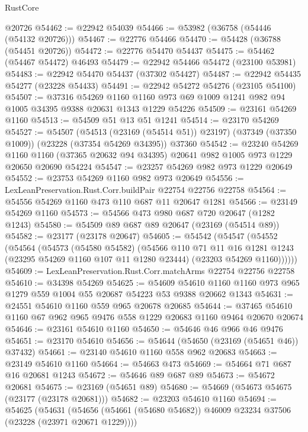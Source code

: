 \begin{lexlean}{RustCore}
\begin{coremodule}
    @20726
@54462 := @22942 @54039
@54466 := @53982 (@36758 (@54446 (@54132 @20726)))
@54467 := @22776 @54466
@54470 := @54428 (@36788 (@54451 @20726))
@54472 := @22776 @54470 @54437
@54475 := @54462 (@54467 @54472) @46493
@54479 := @22942 @54466 @54472 (@23100 @53981)
@54483 := @22942 @54470 @54437 (@37302 @54427)
@54487 := @22942 @54435 @54277 (@23228 @54433)
@54491 := @22942 @54272 @54276 (@23105 @54100)
@54507 := @37316
    @54269
    @1160
    @1160
    @973
    @69
    @1009
    @1241
    @982
    @94
    @1005
    @34395
    @9388
    @20631
    @1343
    @1229
    @54226
@54509 := @23161 @54269 @1160
@54513 := @54509 @51 @13 @51 @1241
@54514 := @23170 @54269
@54527 := @54507
    (@54513 (@23169 (@54514 @51)) @23197)
    (@37349 (@37350 @1009))
    (@23228 (@37354 @54269 @34395))
    @37360
@54542 := @23240
    @54269
    @1160
    @1160
    (@37365 @20632 @94 @34395)
    @20641
    @982
    @1005
    @973
    @1229
    @20650
    @20690
    @54224
@54547 := @23257 @54269 @982 @973 @1229 @20649
@54552 := @23753 @54269 @1160 @982 @973 @20649
@54556 := LexLeanPreservation.Rust.Corr.buildPair @22754 @22756 @22758
@54564 := @54556 @54269 @1160 @473 @110 @687 @11 @20647 @1281
@54566 := @23149 @54269 @1160
@54573 := @54566 @473 @980 @687 @720 @20647 (@1282 @1243)
@54580 := @54509 @89 @687 @89 @20647 (@23169 (@54514 @89))
@54582 := @23177 (@23178 @20647)
@54605 := @54542
    (@54547
      (@54552
        (@54564
          (@54573
            (@54580 @54582)
            (@54566
              @110
              @71
              @11
              @16
              @1281
              @1243
              (@23295 @54269 @1160 @107 @11 @1280 @23444)
              (@23203 @54269 @1160))))))
@54609 := LexLeanPreservation.Rust.Corr.matchArms @22754 @22756 @22758
@54610 := @34398 @54269
@54625 := @54609
    @54610
    @1160
    @1160
    @973
    @965
    @1279
    @559
    @1004
    @55
    @20687
    @54223
    @53
    @9388
    @20662
    @1343
@54631 := @24551 @54610 @1160 @559 @965 @20678 @20685
@54644 := @37465 @54610 @1160 @67 @962 @965 @9476 @558 @1229 @20683 @1160 @9464 @20670 @20674
@54646 := @23161 @54610 @1160
@54650 := @54646 @46 @966 @46 @9476
@54651 := @23170 @54610
@54656 := @54644 (@54650 (@23169 (@54651 @46)) @37432)
@54661 := @23140 @54610 @1160 @558 @962 @20683
@54663 := @23149 @54610 @1160
@54664 := @54663 @473
@54669 := @54664 @71 @687 @16 @20681 @1243
@54672 := @54646 @89 @687 @89
@54673 := @54672 @20681
@54675 := @23169 (@54651 @89)
@54680 := @54669 (@54673 @54675 (@23177 (@23178 @20681)))
@54682 := @23203 @54610 @1160
@54694 := @54625
    (@54631 (@54656 (@54661 (@54680 @54682)) @46009 @23234 @37506 (@23228 (@23971 @20671 @1229))))

\end{coremodule}
\end{lexlean}
